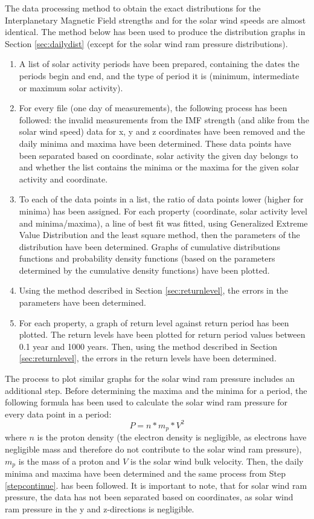 \documentclass[12pt]{article}
\begin{document}
        The data processing method to obtain the exact distributions for the Interplanetary Magnetic Field strengths and for the solar wind speeds are almost identical. The method below has been used to produce the distribution graphs in Section \ref{sec:dailydist} (except for the solar wind ram pressure distributions).
        \begin{enumerate}
            \item A list of solar activity periods have been prepared, containing the dates the periods begin and end, and the type of period it is (minimum, intermediate or maximum solar activity).
            \item For every file (one day of measurements), the following process has been followed: the invalid measurements from the IMF strength (and alike from the solar wind speed) data for x, y and z coordinates have been removed and the daily minima and maxima have been determined. These data points have been separated based on coordinate, solar activity the given day belongs to and whether the list contains the minima or the maxima for the given solar activity and coordinate.\label{stepcontinue}
            \item To each of the data points in a list, the ratio of data points lower (higher for minima) has been assigned. For each property (coordinate, solar activity level and minima/maxima), a line of best fit was fitted, using Generalized Extreme Value Distribution and the least square method, then the parameters of the distribution have been determined. Graphs of cumulative distributions functions and probability density functions (based on the parameters determined by the cumulative density functions) have been plotted.
            \item Using the method described in Section \ref{sec:returnlevel}, the errors in the parameters have been determined.
            \item For each property, a graph of return level against return period has been plotted. The return levels have been plotted for return period values between 0.1 year and 1000 years. Then, using the method described in Section \ref{sec:returnlevel}, the errors in the return levels have been determined.
        \end{enumerate}
        The process to plot similar graphs for the solar wind ram pressure includes an additional step. Before determining the maxima and the minima for a period, the following formula has been used to calculate the solar wind ram pressure for every data point in a period:
        \begin{equation}
            P=n*m_p*V^2
        \end{equation}
        where $n$ is the proton density (the electron density is negligible, as electrons have negligible mass and therefore do not contribute to the solar wind ram pressure), $m_p$ is the mass of a proton and $V$ is the solar wind bulk velocity. Then, the daily minima and maxima have been determined and the same process from Step \ref{stepcontinue}. has been followed. It is important to note, that for solar wind ram pressure, the data has not been separated based on coordinates, as solar wind ram pressure in the y and z-directions is negligible.
\end{document}
